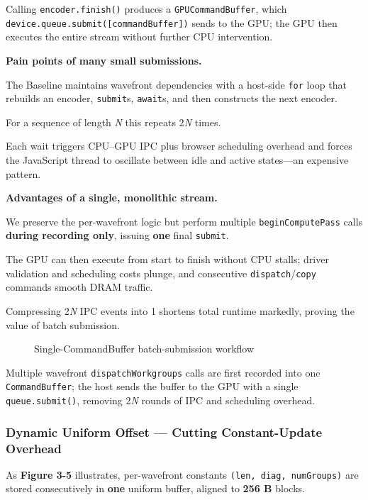 \documentclass[12pt]{report}
\begin{document}
Calling \texttt{encoder.finish()} produces a \texttt{GPUCommandBuffer}, which \texttt{device.queue.submit([commandBuffer])} sends to the GPU; the GPU then executes the entire stream without further CPU intervention.

\textbf{Pain points of many small submissions.}

The Baseline maintains wavefront dependencies with a host-side \texttt{for} loop that rebuilds an encoder, \texttt{submit}s, \texttt{await}s, and then constructs the next encoder.

For a sequence of length \emph{N} this repeats 2\emph{N} times.

Each wait triggers CPU–GPU IPC plus browser scheduling overhead and forces the JavaScript thread to oscillate between idle and active states—an expensive pattern.

\textbf{Advantages of a single, monolithic stream.}

We preserve the per-wavefront logic but perform multiple \texttt{beginComputePass} calls \textbf{during recording only}, issuing \textbf{one} final \texttt{submit}.

The GPU can then execute from start to finish without CPU stalls; driver validation and scheduling costs plunge, and consecutive \texttt{dispatch}/\texttt{copy} commands smooth DRAM traffic.

Compressing 2\emph{N} IPC events into 1 shortens total runtime markedly, proving the value of batch submission.

\begin{figure}[h]
    \caption{Single-CommandBuffer batch-submission workflow}
    \label{fig:cmd_buffer}
\end{figure}

Multiple wavefront \texttt{dispatchWorkgroups} calls are first recorded into one \texttt{CommandBuffer}; the host sends the buffer to the GPU with a single \texttt{queue.submit()}, removing 2\emph{N} rounds of IPC and scheduling overhead.

\subsubsection{Dynamic Uniform Offset — Cutting Constant-Update Overhead}
As \textbf{Figure 3-5} illustrates, per-wavefront constants \texttt{(len, diag, numGroups)} are stored consecutively in \textbf{one} uniform buffer, aligned to \textbf{256 B} blocks.
\end{document}
